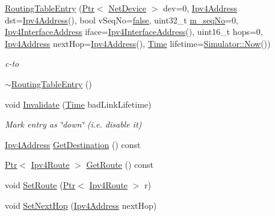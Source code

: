 \begin{DoxyCompactItemize}
\item 
\hyperlink{classns3_1_1aodv_1_1RoutingTableEntry_a2fdba4b52539fbeae746e7efb776fa98}{Routing\+Table\+Entry} (\hyperlink{classns3_1_1Ptr}{Ptr}$<$ \hyperlink{classns3_1_1NetDevice}{Net\+Device} $>$ dev=0, \hyperlink{classns3_1_1Ipv4Address}{Ipv4\+Address} dst=\hyperlink{classns3_1_1Ipv4Address}{Ipv4\+Address}(), bool v\+Seq\+No=\hyperlink{lte__cqi__generation_8m_ab1bef239d413c4da139c4bac92cd657a}{false}, uint32\+\_\+t \hyperlink{classns3_1_1aodv_1_1RoutingTableEntry_add3bc8ee00507187eeddbb42cfa096f8}{m\+\_\+seq\+No}=0, \hyperlink{classns3_1_1Ipv4InterfaceAddress}{Ipv4\+Interface\+Address} iface=\hyperlink{classns3_1_1Ipv4InterfaceAddress}{Ipv4\+Interface\+Address}(), uint16\+\_\+t hops=0, \hyperlink{classns3_1_1Ipv4Address}{Ipv4\+Address} next\+Hop=\hyperlink{classns3_1_1Ipv4Address}{Ipv4\+Address}(), \hyperlink{classns3_1_1Time}{Time} lifetime=\hyperlink{classns3_1_1Simulator_ac3178fa975b419f7875e7105be122800}{Simulator\+::\+Now}())
\begin{DoxyCompactList}\small\item\em c-\/to \end{DoxyCompactList}\item 
\hyperlink{classns3_1_1aodv_1_1RoutingTableEntry_a8bb1a0802ce3487ac2e60725d47d77fc}{$\sim$\+Routing\+Table\+Entry} ()
\item 
void \hyperlink{classns3_1_1aodv_1_1RoutingTableEntry_a828a495f05feac45830d398ad0704e5f}{Invalidate} (\hyperlink{classns3_1_1Time}{Time} bad\+Link\+Lifetime)
\begin{DoxyCompactList}\small\item\em Mark entry as \char`\"{}down\char`\"{} (i.\+e. disable it) \end{DoxyCompactList}\item 
\hyperlink{classns3_1_1Ipv4Address}{Ipv4\+Address} \hyperlink{classns3_1_1aodv_1_1RoutingTableEntry_a5c60045f334605d2227164298ea19393}{Get\+Destination} () const 
\item 
\hyperlink{classns3_1_1Ptr}{Ptr}$<$ \hyperlink{classns3_1_1Ipv4Route}{Ipv4\+Route} $>$ \hyperlink{classns3_1_1aodv_1_1RoutingTableEntry_a5174937f6799d1240611c991c6ac7a73}{Get\+Route} () const 
\item 
void \hyperlink{classns3_1_1aodv_1_1RoutingTableEntry_a0d3ded2566387965bed915bc0a47a710}{Set\+Route} (\hyperlink{classns3_1_1Ptr}{Ptr}$<$ \hyperlink{classns3_1_1Ipv4Route}{Ipv4\+Route} $>$ r)
\item 
void \hyperlink{classns3_1_1aodv_1_1RoutingTableEntry_a46a3672f9555ad083efa667be2875cec}{Set\+Next\+Hop} (\hyperlink{classns3_1_1Ipv4Address}{Ipv4\+Address} next\+Hop)

\end{DoxyCompactItemize}
